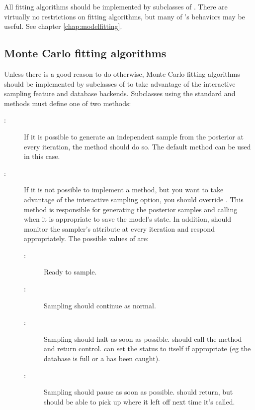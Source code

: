 All fitting algorithms should be implemented by subclasses of . There are virtually no restrictions on fitting algorithms, but many of 's behaviors may be useful. See chapter \ref{chap:modelfitting}. 

\hypertarget{custom-MC}{}
\subsection*{Monte Carlo fitting algorithms} \label{custom-MC}

Unless there is a good reason to do otherwise, Monte Carlo fitting algorithms should be implemented by subclasses of  to take advantage of the interactive sampling feature and database backends. Subclasses using the standard  and  methods must define one of two methods:
\begin{description}
   \item[:] If it is possible to generate an independent sample from the posterior at every iteration, the  method should do so. The default  method can be used in this case.
   \item[:] If it is not possible to implement a  method, but you want to take advantage of the interactive sampling option, you should override . This method is responsible for generating the posterior samples and calling  when it is appropriate to save the model's state. In addition,  should monitor the sampler's  attribute at every iteration and respond appropriately. The possible values of  are:
   \begin{description}
      \item[:] Ready to sample.
      \item[:] Sampling should continue as normal.
      \item[:] Sampling should halt as soon as possible.  should call the  method and return control.  can set the status to  itself if appropriate (eg the database is full or a  has been caught).
      \item[:] Sampling should pause as soon as possible.  should return, but should be able to pick up where it left off next time it's called.
   \end{description}
\end{description}

